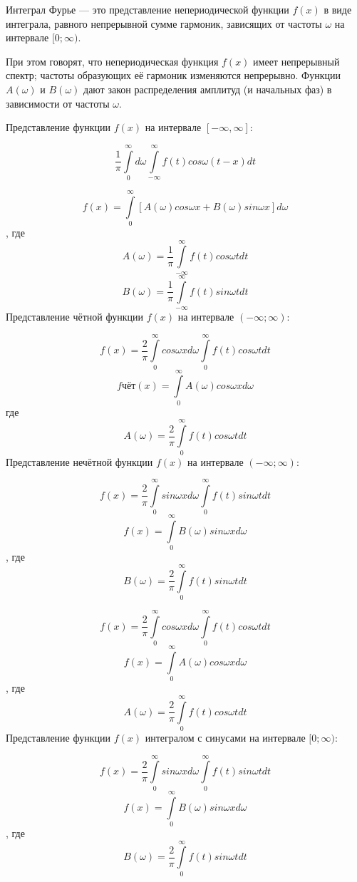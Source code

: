 
Интеграл Фурье — это представление непериодической функции $f(x)$ в виде интеграла, равного непрерывной сумме гармоник, зависящих от частоты $\omega$ на интервале $[0; \infty)$.

При этом говорят, что непериодическая функция $f(x)$ имеет непрерывный спектр; частоты образующих её гармоник изменяются непрерывно. Функции $A(\omega)$ и $B(\omega)$ дают закон распределения амплитуд (и начальных фаз) в зависимости от частоты $\omega$.

Представление функции $f(x)$ на интервале $[-\infty, \infty]$:

$$\frac 1{\pi}\int\limits_0^{\infty}d\omega\int\limits_{-\infty}^{\infty}f(t)cos\omega(t-x)dt$$

$$f(x)=\int\limits_0^{\infty}[A(\omega)cos\omega x+
B(\omega)sin\omega x]d\omega$$
, где
$$A(\omega)=\frac 1{\pi}\int\limits_{-\infty}^{\infty} f(t)cos\omega tdt$$ 
$$B(\omega)=\frac 1{\pi}\int\limits_{-\infty}^{\infty}f(t)sin\omega tdt$$
Представление чётной функции $f(x)$ на интервале $(-\infty; \infty)$:

$$f(x)=\frac 2{\pi}\int\limits_0^{\infty} cos\omega xd\omega\int\limits_0^{\infty} f(t)cos\omega tdt$$
$$fчёт(x)=\int\limits_0^{\infty} A(\omega)cos\omega xd\omega$$
 где $$A(\omega)=\frac 2{\pi}\int\limits_0^{\infty} f(t)cos\omega tdt$$
Представление нечётной функции $f(x)$ на интервале $(-\infty; \infty)$:

$$f(x)=\frac 2{\pi}\int\limits_0^{\infty}sin\omega xd\omega\int\limits_0^{\infty} f(t)sin\omega tdt$$
$$f(x)=\int\limits_0^{\infty}B(\omega)sin\omega xd\omega$$
, где $$B(\omega)=\frac{2}{\pi}\int\limits_0^{\infty}f(t)sin \omega tdt$$

$$f(x)=\frac 2{\pi}\int\limits_0^{\infty}cos\omega xd\omega\int\limits_0^{\infty} f(t)cos\omega tdt$$
$$f(x)=\int\limits_0^{\infty} A(\omega)cos\omega xd\omega$$
, где $$A(\omega)=\frac2{\pi}\int\limits_0^{\infty} f(t)cos\omega tdt$$
Представление функции $f(x)$ интегралом с синусами на интервале $[0; \infty)$:

$$f(x)=\frac 2{\pi}\int\limits_0^{\infty}sin\omega xd\omega\int\limits_0^{\infty} f(t)sin\omega tdt$$
$$f(x)=\int\limits_0^{\infty} B(\omega)sin\omega xd\omega$$
, где $$B(\omega)=\frac 2{\pi}\int\limits_0^{\infty} f(t)sin\omega tdt$$
